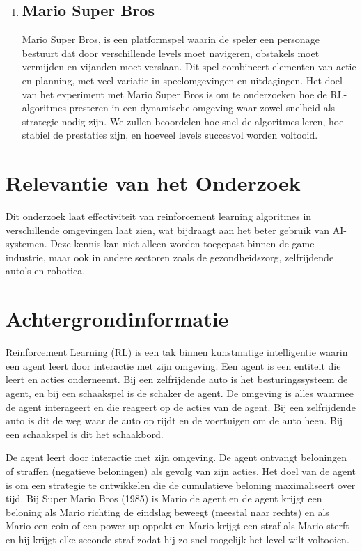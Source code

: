 \documentclass[a4paper,12pt]{article}
\begin{document}
\begin{enumerate}
    \item\subsection*{Mario Super Bros}
          Mario Super Bros, is een platformspel waarin de speler een personage bestuurt
          dat door verschillende levels moet navigeren, obstakels moet vermijden en
          vijanden moet verslaan. Dit spel combineert elementen van actie en planning,
          met veel variatie in speelomgevingen en uitdagingen. Het doel van het
          experiment met Mario Super Bros is om te onderzoeken hoe de RL-algoritmes
          presteren in een dynamische omgeving waar zowel snelheid als strategie nodig
          zijn. We zullen beoordelen hoe snel de algoritmes leren, hoe stabiel de
          prestaties zijn, en hoeveel levels succesvol worden voltooid.
\end{enumerate}

\section{Relevantie van het Onderzoek}
Dit onderzoek laat effectiviteit van reinforcement learning algoritmes in
verschillende omgevingen laat zien, wat bijdraagt aan het beter gebruik van
AI-systemen. Deze kennis kan niet alleen worden toegepast binnen de
game-industrie, maar ook in andere sectoren zoals de gezondheidszorg,
zelfrijdende auto's en robotica.

\section{Achtergrondinformatie}
Reinforcement Learning (RL) is een tak binnen kunstmatige intelligentie waarin
een agent leert door interactie met zijn omgeving. Een agent is een entiteit
die leert en acties onderneemt. Bij een zelfrijdende auto is het
besturingssysteem de agent, en bij een schaakspel is de schaker de agent. De
omgeving is alles waarmee de agent interageert en die reageert op de acties van
de agent. Bij een zelfrijdende auto is dit de weg waar de auto op rijdt en de
voertuigen om de auto heen. Bij een schaakspel is dit het schaakbord.

De agent leert door interactie met zijn omgeving. De agent ontvangt beloningen
of straffen (negatieve beloningen) als gevolg van zijn acties. Het doel van de
agent is om een strategie te ontwikkelen die de cumulatieve beloning
maximaliseert over tijd. Bij Super Mario Bros (1985) is Mario de agent en de
agent krijgt een beloning als Mario richting de eindslag beweegt (meestal naar
rechts) en als Mario een coin of een power up oppakt en Mario krijgt een straf
als Mario sterft en hij krijgt elke seconde straf zodat hij zo snel mogelijk
het level wilt voltooien.
\end{document}
